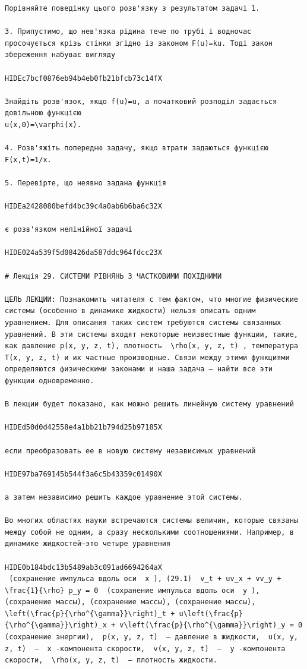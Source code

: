 \documentclass[
  ukrainian,
]{article}
\begin{document}
\begin{verbatim}
Порівняйте поведінку цього розв'язку з результатом задачі 1.

3. Припустимо, що нев'язка рідина тече по трубі і водночас просочується крізь стінки згідно із законом F(u)=ku. Тоді закон збереження набуває вигляду

HIDEc7bcf0876eb94b4eb0fb21bfcb73c14fX

Знайдіть розв'язок, якщо f(u)=u, а початковий розподіл задається довільною функцією
u(x,0)=\varphi(x).

4. Розв'яжіть попередню задачу, якщо втрати задаються функцією F(x,t)=1/x.

5. Перевірте, що неявно задана функція

HIDEa2428080befd4bc39c4a0ab6b6ba6c32X

є розв'язком нелінійної задачі

HIDE024a539f5d08426da587ddc964fdcc23X

# Лекція 29. СИСТЕМИ РІВНЯНЬ З ЧАСТКОВИМИ ПОХІДНИМИ

ЦЕЛЬ ЛЕКЦИИ: Познакомить читателя с тем фактом, что многие физические системы (особенно в динамике жидкости) нельзя описать одним уравнением. Для описания таких систем требуются системы связанных уравнений. В эти системы входят некоторые неизвестные функции, такие, как давление p(x, y, z, t), плотность  \rho(x, y, z, t) , температура T(x, y, z, t) и их частные производные. Связи между этими функциями определяются физическими законами и наша задача — найти все эти функции одновременно.

В лекции будет показано, как можно решить линейную систему уравнений

HIDEd50d0d42558e4a1bb21b794d25b97185X

если преобразовать ее в новую систему независимых уравнений

HIDE97ba769145b544f3a6c5b43359c01490X

а затем независимо решить каждое уравнение этой системы.

Во многих областях науки встречаются системы величин, которые связаны между собой не одним, а сразу несколькими соотношениями. Например, в динамике жидкостей—это четыре уравнения

HIDE0b184bdc13b5489ab3c091ad6694264aX
 (сохранение импульса вдоль оси  x ), (29.1)  v_t + uv_x + vv_y + \frac{1}{\rho} p_y = 0  (сохранение импульса вдоль оси  y ), (сохранение массы), (сохранение массы), (сохранение массы),  \left(\frac{p}{\rho^{\gamma}}\right)_t + u\left(\frac{p}{\rho^{\gamma}}\right)_x + v\left(\frac{p}{\rho^{\gamma}}\right)_y = 0  (сохранение энергии),  p(x, y, z, t)  — давление в жидкости,  u(x, y, z, t)  —  x -компонента скорости,  v(x, y, z, t)  —  y -компонента скорости,  \rho(x, y, z, t)  — плотность жидкости.


\end{verbatim}
\end{document}
